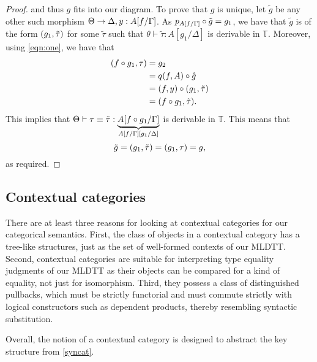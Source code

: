 \documentclass[10pt,letterpaper,cm]{nupset}
\theoremstyle{definition}
\theoremstyle{theorem}
\theoremstyle{remark}
\newcommand{\0}{\mathbf{0}}
\newcommand{\1}{\mathbf{1}}
\newcommand{\2}{\mathbf{2}}
\newcommand{\T}{\mathbb T}
\begin{document}
\begin{proof}
and thus $g$ fits into our diagram. To prove that $g$ is unique, let $\tilde{g}$ be any other such morphism $\Theta \to {\Delta, y : A\mleft[f/\Gamma\mright]}$. As $p_{A\mleft[f/\Gamma\mright]} \circ \tilde{g} = g_1$, we have that $\tilde{g}$ is of the form $\mleft(g_1, \tilde{\tau}\mright)$ for some  $\tilde{\tau}$ such that $\theta \vdash \tilde{\tau} : A[g_1/\Delta]$ is derivable in $\T$. Moreover, using \eqref{eqn:one}, we have that
\begin{align*}
 \mleft(f \circ g_1, \tau\mright) & = g_2 
\\ & = q(f,A) \circ \hat{g} 
\\ & = \mleft(f, y\mright) \circ \mleft(g_1, \tilde{\tau}\mright)
\\ & = \mleft(f \circ g_1, \tilde{\tau}\mright).
\end{align*}
This implies that $\Theta \vdash \tau \equiv \tilde{\tau} : \underbrace{A[f\circ g_1/\Gamma]}_{A\mleft[f/\Gamma\mright]\mleft[g_1/\Delta\mright]}$ is derivable in $\T$. This means that $$\tilde{g} = \mleft(g_1, \tilde{\tau}\mright) = \mleft(g_1, \tau\mright) = g,$$ as required. 
\end{proof}


\subsection{Contextual categories}\label{CC}

There are at least three reasons for looking at contextual categories for our categorical semantics. First, the class of objects in a contextual category has a tree-like structures, just as the set of well-formed contexts of our MLDTT. Second, contextual categories are suitable for interpreting type equality judgments of our MLDTT as their objects can be compared for a kind of equality, not just for isomorphism. Third, they possess a  class of distinguished pullbacks, which must be strictly functorial and must commute strictly with logical constructors such as dependent products, thereby resembling syntactic substitution.

\medskip 

Overall, the notion of a contextual category is designed to abstract the key structure from \cref{syncat}.
\end{document}
